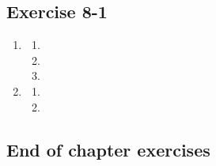 \subsection{Exercise 8-1} %
\begin{enumerate}[label=\textbf{\arabic*}.]
\item %
 \begin{enumerate}[noitemsep, label=\textbf{(\alph*)} ] 
\item %
\item %
\item %
\end{enumerate}

\item %
 \begin{enumerate}[noitemsep, label=\textbf{(\alph*)} ] 
\item %
\item %
\end{enumerate}
\end{enumerate}


\subsection{End of chapter exercises} %

